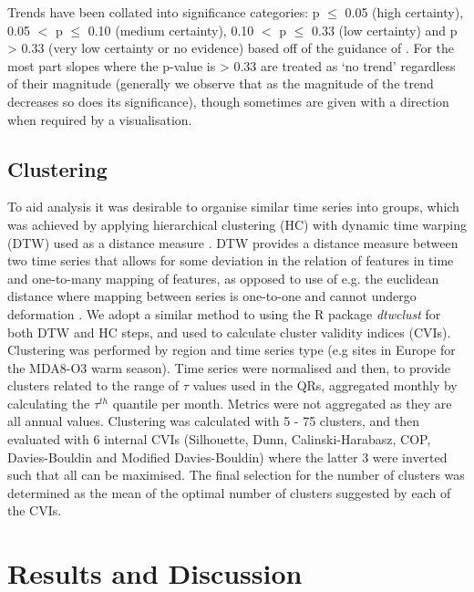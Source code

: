 \documentclass[journal abbreviation, manuscript]{copernicus}
\begin{document}
Trends have been collated into significance categories: p $\le$ 0.05 (high certainty), 0.05 $<$ p $\le$ 0.10 (medium certainty), 0.10 $<$ p $\le$ 0.33 (low certainty) and p > 0.33 (very low certainty or no evidence) based off of the guidance of \cite{chang2023guidancenotebeststatistical}. For the most part slopes where the p-value is > 0.33 are treated as ‘no trend’ regardless of their magnitude (generally we observe that as the magnitude of the trend decreases so does its significance), though sometimes are given with a direction when required by a visualisation.

\subsection{Clustering} \label{sect:method_clustering}
To aid analysis it was desirable to organise similar time series into groups, which was achieved by applying hierarchical clustering (HC) with dynamic time warping (DTW) used as a distance measure \citep{AGHABOZORGI201516}. DTW provides a distance measure between two time series that allows for some deviation in the relation of features in time and one-to-many mapping of features, as opposed to use of e.g. the euclidean distance where mapping between series is one-to-one and cannot undergo deformation \citep{Berndt_dtw, Abdullah_Keogh_dtw}. We adopt a similar method to \cite{REED2025110686} using the R package \emph{dtwclust} \citep{dtwclust} for both DTW and HC steps, and used to calculate cluster validity indices (CVIs). Clustering was performed by region and time series type (e.g sites in Europe for the MDA8-O3 warm season). Time series were normalised and then, to provide clusters related to the range of $\tau$ values used in the QRs, aggregated monthly by calculating the $\tau^{th}$ quantile per month. Metrics were not aggregated as they are all annual values. Clustering was calculated with 5 - 75 clusters, and then evaluated with 6 internal CVIs (Silhouette, Dunn, Calinski-Harabasz, COP, Davies-Bouldin and Modified Davies-Bouldin) where the latter 3 were inverted such that all can be maximised. The final selection for the number of clusters was determined as the mean of the optimal number of clusters suggested by each of the CVIs. 

\clearpage
\section{Results and Discussion}
\end{document}
